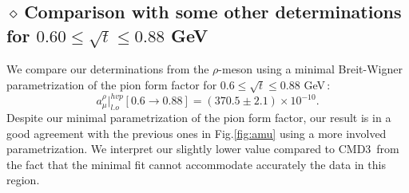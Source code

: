 \documentclass[review]{elsarticle}
\def\beq{\begin{equation}}
\def\eeq{\end{equation}}
\def\d{$\diamond~$}
\begin{document}
\subsection*{\hspace*{0.5cm}\d Comparison with some other determinations for $0.60\leq \sqrt{t}\leq 0.88$ GeV}
We compare our determinations from the $\rho$-meson using a minimal Breit-Wigner parametrization of the pion form factor for $0.6\leq \sqrt{t}\leq 0.88$ GeV\,:
\beq
a_\mu^{\rho}\vert^{hvp}_{l.o}[0.6\to 0.88]=(370.5\pm 2.1)\times 10^{-10}.
\label{eq:compare}
\eeq
\vspace*{-0.10cm}
 Despite our minimal parametrization of the pion form factor, our result is in a good agreement 
 with the previous ones in Fig.\ref{fig:amu} using  a more involved parametrization. We interpret our slightly lower value compared to CMD3\,\cite{CMD3} from the fact that the minimal fit cannot accommodate accurately the data in this region.  \\
\end{document}
